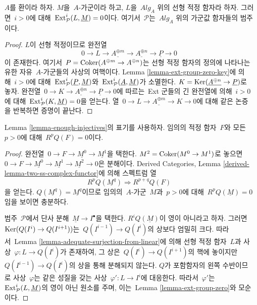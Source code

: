 \begin{lemma}
\label{lemma-ext-group-zero}
$A$를 환이라 하자. $M$을\  $A$-가군이라 하고, $L$을\ 
$\textit{Alg}_A$ 위의 선형 적정 함자라 하자. 그러면\  $i > 0$에 대해\ 
$\mathop{\mathrm{Ext}}\nolimits^i_\mathcal{P}(L, \underline{M}) = 0$이다. 여기서\  $\mathcal{P}$는\ 
$\textit{Alg}_A$ 위의 가군값 함자들의 범주이다.
\end{lemma}

\begin{proof}
$L$이 선형 적정이므로 완전열
$$
0 \to L \to \underline{A^{\oplus m}} \to \underline{A^{\oplus n}} \to
\underline{P} \to 0
$$
이 존재한다. 여기서\  $P = \mathop{\mathrm{Coker}}(A^{\oplus m} \to A^{\oplus n})$는
선형 적정 함자의 정의에 나타나는 유한 자유\  $A$-가군들의 사상의
여핵이다. Lemma \ref{lemma-ext-group-zero-key}에 의해\  $i > 0$에 대해\ 
$\mathop{\mathrm{Ext}}\nolimits^i_\mathcal{P}(\underline{P}, \underline{M})$와\ 
$\mathop{\mathrm{Ext}}\nolimits^i_\mathcal{P}(\underline{A}, \underline{M})$가 소멸한다.
$K = \mathop{\mathrm{Ker}}(\underline{A^{\oplus n}} \to \underline{P})$로 놓자. 완전열\ 
$0 \to K \to \underline{A^{\oplus n}} \to \underline{P} \to 0$에
따르는\  Ext 군들의 긴 완전열에 의해\  $i > 0$에 대해\ 
$\mathop{\mathrm{Ext}}\nolimits^i_\mathcal{P}(K, \underline{M}) = 0$을 얻는다. 열\ 
$0 \to L \to \underline{A^{\oplus m}} \to K \to 0$에 대해 같은 논증을
반복하면 증명이 끝난다.
\end{proof}

\begin{lemma}
\label{lemma-RQ-zero}
Lemma \ref{lemma-enough-injectives}의 표기를 사용하자. 임의의 적정 함자\ 
$F$와 모든\  $p > 0$에 대해\  $R^pQ(F) = 0$이다.
\end{lemma}

\begin{proof}
완전열\  $0 \to F \to \underline{M^0} \to \underline{M^1}$을 택한다.
$M^2 = \mathop{\mathrm{Coker}}(M^0 \to M^1)$로 놓으면\ 
$0 \to F \to \underline{M^0} \to \underline{M^1}
\to \underline{M^2} \to 0$은 분해이다. Derived Categories, Lemma
\ref{derived-lemma-two-ss-complex-functor}에 의해 스펙트럼 열
$$
R^pQ(\underline{M^q}) \Rightarrow R^{p + q}Q(F)
$$
을 얻는다. $Q(\underline{M^q}) = \underline{M^q}$이므로 임의의\ 
$A$-가군\  $M$과\  $p > 0$에 대해\  $R^pQ(\underline{M}) = 0$임을 보이면
충분하다.

\medskip\noindent
범주\  $\mathcal{P}$에서 단사 분해\  $\underline{M} \to I^\bullet$을 택한다.
$R^iQ(\underline{M})$이 영이 아니라고 하자. 그러면\ 
$\mathop{\mathrm{Ker}}(Q(I^i) \to Q(I^{i + 1}))$는\  $Q(I^{i - 1}) \to Q(I^i)$의 상보다
엄밀히 크다. 따라서\  Lemma \ref{lemma-adequate-surjection-from-linear}에
의해 선형 적정 함자\  $L$과 사상\  $\varphi : L \to Q(I^i)$가 존재하여,
그 상은\  $Q(I^i) \to Q(I^{i + 1})$의 핵에 놓이지만\ 
$Q(I^{i - 1}) \to Q(I^i)$의 상을 통해 분해되지 않는다. $Q$가 포함함자의
왼쪽 수반이므로 사상\  $\varphi$는 같은 성질을 갖는 사상\ 
$\varphi' : L \to I^i$에 대응한다. 따라서\  $\varphi'$는\ 
$\mathop{\mathrm{Ext}}\nolimits^i_\mathcal{P}(L, \underline{M})$의 영이 아닌 원소를 주며, 이는\ 
Lemma \ref{lemma-ext-group-zero}와 모순이다.
\end{proof}














